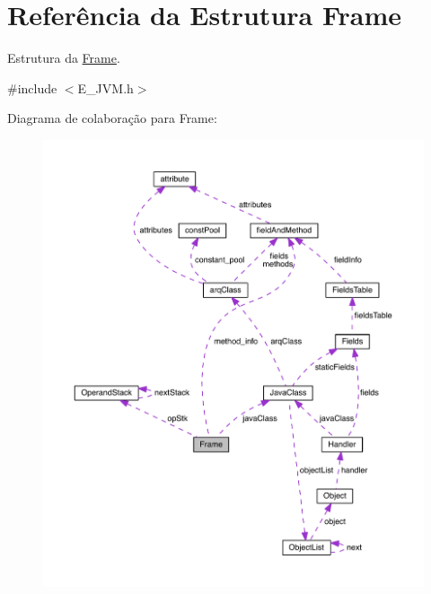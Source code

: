 \hypertarget{struct_frame}{}\section{Referência da Estrutura Frame}
\label{struct_frame}


Estrutura da \hyperlink{struct_frame}{Frame}.  




{\ttfamily \#include $<$E\+\_\+\+J\+V\+M.\+h$>$}



Diagrama de colaboração para Frame\+:\nopagebreak
\begin{figure}[H]
\begin{center}
\leavevmode
\includegraphics[width=350pt]{struct_frame__coll__graph}
\end{center}
\end{figure}
